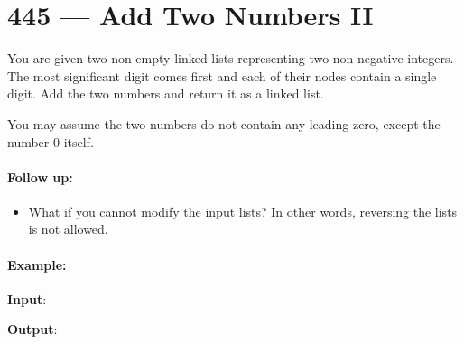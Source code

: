 \section{445 --- Add Two Numbers II}
You are given two non-empty linked lists representing two non-negative integers. The most significant digit comes first and each of their nodes contain a single digit. Add the two numbers and return it as a linked list.

You may assume the two numbers do not contain any leading zero, except the number 0 itself.

\paragraph{Follow up:}

\begin{itemize}
\item What if you cannot modify the input lists? In other words, reversing the lists is not allowed.
\end{itemize}

\paragraph{Example:}
\begin{flushleft}

\textbf{Input}:

\begin{figure}[H]
\end{figure}

\textbf{Output}:

\begin{figure}[H]
\end{figure}

\end{flushleft}


